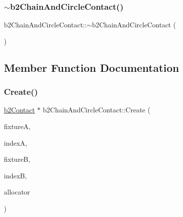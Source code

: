 \mbox{\label{classb2_chain_and_circle_contact_a2a6183729344e888840168a7207357ab}} 
\subsubsection{\texorpdfstring{$\sim$b2ChainAndCircleContact()}{~b2ChainAndCircleContact()}}
{\footnotesize\ttfamily b2\+Chain\+And\+Circle\+Contact\+::$\sim$b2\+Chain\+And\+Circle\+Contact (\begin{DoxyParamCaption}{ }\end{DoxyParamCaption})\hspace{0.3cm}{\ttfamily [inline]}}



\subsection{Member Function Documentation}
\mbox{\label{classb2_chain_and_circle_contact_a9738f9b3eeddb824213abaae78ff6a73}} 
\subsubsection{\texorpdfstring{Create()}{Create()}}
{\footnotesize\ttfamily \mbox{\hyperlink{classb2_contact}{b2\+Contact}} $\ast$ b2\+Chain\+And\+Circle\+Contact\+::\+Create (\begin{DoxyParamCaption}\item[{\mbox{\hyperlink{classb2_fixture}{b2\+Fixture}} $\ast$}]{fixtureA,  }\item[{\mbox{\hyperlink{b2_settings_8h_a43d43196463bde49cb067f5c20ab8481}{int32}}}]{indexA,  }\item[{\mbox{\hyperlink{classb2_fixture}{b2\+Fixture}} $\ast$}]{fixtureB,  }\item[{\mbox{\hyperlink{b2_settings_8h_a43d43196463bde49cb067f5c20ab8481}{int32}}}]{indexB,  }\item[{\mbox{\hyperlink{classb2_block_allocator}{b2\+Block\+Allocator}} $\ast$}]{allocator }\end{DoxyParamCaption})\hspace{0.3cm}{\ttfamily [static]}}

